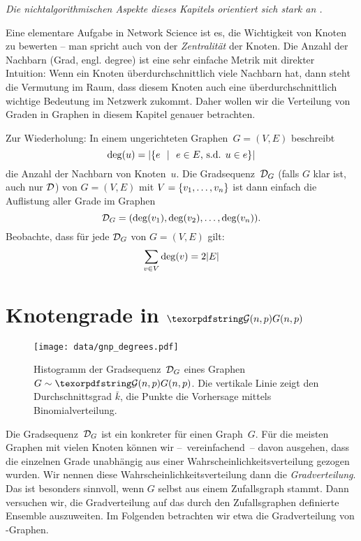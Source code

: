 \emph{Die nichtalgorithmischen Aspekte dieses Kapitels orientiert sich stark an \cite{barabasi2014network}.}
\bigskip

Eine elementare Aufgabe in Network Science ist es, die Wichtigkeit von Knoten zu bewerten -- man spricht auch  von der \emph{Zentralität} der Knoten.
Die Anzahl der Nachbarn (Grad, engl. degree) ist eine sehr einfache Metrik mit direkter Intuition:
Wenn ein Knoten überdurchschnittlich viele Nachbarn hat, dann steht die Vermutung im Raum, dass diesem Knoten auch eine überdurchschnittlich wichtige Bedeutung im Netzwerk zukommt.
Daher wollen wir die Verteilung von Graden in Graphen in diesem Kapitel genauer betrachten.

Zur Wiederholung:
In einem ungerichteten Graphen~$G=(V,E)$ beschreibt
\begin{equation}
    \deg(u) = \lvert \left\{ e \ \ \middle|\ \ e \in E\text{, s.d. } u \in e \right\}\rvert
\end{equation}
die Anzahl der Nachbarn von Knoten~$u$.
Die  Gradsequenz~$\mathcal{D}_G$ (falls $G$ klar ist, auch nur $\mathcal{D}$) von $G=(V,E)$ mit $V=\left\{v_1, \ldots, v_n\right\}$ ist dann einfach die Auflistung aller Grade im Graphen
\begin{equation}
    \mathcal{D}_G = (\deg(v_1), \deg(v_2), \ldots, \deg(v_n)).
\end{equation}
Beobachte, dass für jede $\mathcal{D}_G$ von $G=(V,E)$ gilt:
\begin{equation}
    \sum_{v \in V} \deg(v) = 2 \lvert E\rvert
\end{equation}


\section{Knotengrade in $\Gnp$}
\begin{figure}
    \begin{center}
        \texttt{[image: data/gnp\_degrees.pdf]}
    \end{center}
    \caption{
        Histogramm der Gradsequenz~$\mathcal{D}_G$ eines Graphen~$G \sim \Gnp$.
        Die vertikale Linie zeigt den Durchschnittsgrad $\bar k$,
        die Punkte die Vorhersage mittels Binomialverteilung.
    }
    \label{fig:histogram_grade_gnp}
\end{figure}

Die Gradsequenz~$\mathcal{D}_G$ ist ein konkreter  für einen Graph~$G$.
Für die meisten Graphen mit vielen Knoten können wir --~vereinfachend~-- davon ausgehen, dass die einzelnen Grade unabhängig aus einer Wahrscheinlichkeitsverteilung gezogen wurden.
Wir  nennen diese Wahrscheinlichkeitsverteilung dann die \emph{Gradverteilung}.
Das ist besonders sinnvoll, wenn $G$ selbst aus einem Zufallsgraph stammt.
Dann versuchen wir, die Gradverteilung auf das durch den Zufallsgraphen definierte Ensemble auszuweiten.
Im Folgenden betrachten wir etwa die Gradverteilung von \Gnp-Graphen.

